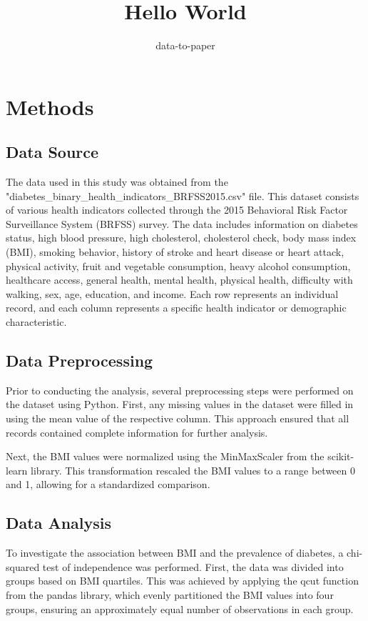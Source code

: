 \documentclass[12pt]{article}
\title{Hello World}
\author{data-to-paper}
\begin{document}
\maketitle

\section{Methods}

\subsection{Data Source}
The data used in this study was obtained from the "diabetes\_binary\_health\_indicators\_BRFSS2015.csv" file. This dataset consists of various health indicators collected through the 2015 Behavioral Risk Factor Surveillance System (BRFSS) survey. The data includes information on diabetes status, high blood pressure, high cholesterol, cholesterol check, body mass index (BMI), smoking behavior, history of stroke and heart disease or heart attack, physical activity, fruit and vegetable consumption, heavy alcohol consumption, healthcare access, general health, mental health, physical health, difficulty with walking, sex, age, education, and income. Each row represents an individual record, and each column represents a specific health indicator or demographic characteristic.

\subsection{Data Preprocessing}
Prior to conducting the analysis, several preprocessing steps were performed on the dataset using Python. First, any missing values in the dataset were filled in using the mean value of the respective column. This approach ensured that all records contained complete information for further analysis. 

Next, the BMI values were normalized using the MinMaxScaler from the scikit-learn library. This transformation rescaled the BMI values to a range between 0 and 1, allowing for a standardized comparison.

\subsection{Data Analysis}
To investigate the association between BMI and the prevalence of diabetes, a chi-squared test of independence was performed. First, the data was divided into groups based on BMI quartiles. This was achieved by applying the qcut function from the pandas library, which evenly partitioned the BMI values into four groups, ensuring an approximately equal number of observations in each group.
\end{document}
